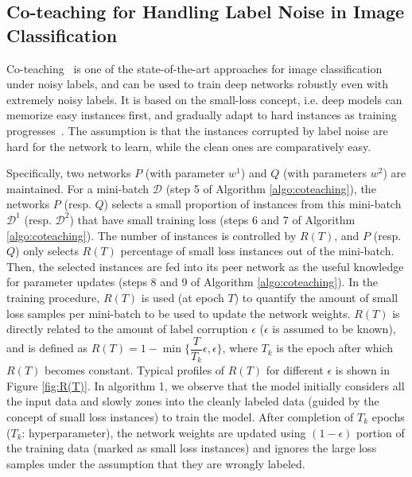 \subsection{Co-teaching for Handling Label Noise in Image Classification}
Co-teaching~\cite{coteaching} is one of the state-of-the-art approaches for image classification under noisy labels, and can be used to train deep networks robustly even with extremely noisy labels.
It is based on the small-loss concept, i.e. deep models can memorize easy instances first, and gradually adapt to hard instances as training progresses~\cite{memorization}. 
The assumption is that the instances corrupted by label noise are hard for the network to learn, while the clean ones are comparatively easy. 

Specifically, two networks $P$ (with parameter $w^1$) and $Q$ (with parameters $w^2$) are maintained. 
For a mini-batch $\mathcal{D}$ (step 5 of Algorithm \ref{algo:coteaching}), the networks $P$ (resp. $Q$) selects a small proportion of instances from this mini-batch $\mathcal{D}^1$ (resp. $\mathcal{D}^2$) that have small training loss (steps 6 and 7 of Algorithm \ref{algo:coteaching}). 
The number of instances is controlled by $R(T)$, and $P$ (resp. $Q$) only selects $R(T)$ percentage of small loss instances out of the mini-batch. Then, the selected instances are fed into its peer network as the useful knowledge for parameter updates (steps 8 and 9 of Algorithm \ref{algo:coteaching}).
In the training procedure, $R(T)$ is used (at epoch $T$) to quantify the amount of small loss
samples per mini-batch to be used to update the network weights. $R(T)$ is directly related
to the amount of label corruption $\epsilon$ ($\epsilon$ is assumed to be known), and is defined as $R(T)= 1- \min\bigg\{\dfrac{T}{T_k}\epsilon, \epsilon\bigg\}$, where $T_k$ is the epoch after which $R(T)$ becomes constant. Typical profiles of $R(T)$ for different $\epsilon$ is shown in Figure \ref{fig:R(T)}. In algorithm 1, we observe that the model initially considers all the input data and slowly zones into the cleanly labeled data (guided by the concept of small loss instances) to train the model. After completion of $T_k$ epochs ($T_k$: hyperparameter), the network weights are updated using $(1 - \epsilon)$ portion of the training data (marked as small loss instances) and ignores the large loss samples under the assumption that they are wrongly labeled.
